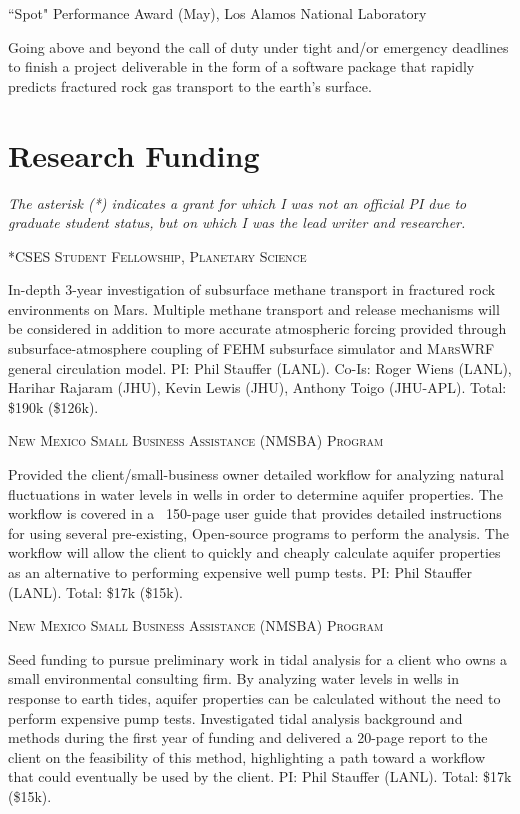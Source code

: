 \documentclass[11pt, letterpaper]{article}
\newcommand{\years}[1]{\marginnote{\scriptsize #1}}
\begin{document}
\years{2018}“Spot" Performance Award (May), Los Alamos National Laboratory
\begin{adjustwidth}{5pt}{0pt}
	Going above and beyond the call of duty under tight and/or emergency
	deadlines to finish a project deliverable in the form of a software package
	that rapidly predicts fractured rock gas transport to the earth’s surface.
\end{adjustwidth}

\section*{Research Funding}
\noindent
\emph{The asterisk (*) indicates a grant for which I was not an official PI due
to graduate student status, but on which I was the lead writer and researcher.}

\years{2021}\textsc{*CSES Student Fellowship, Planetary Science}
\begin{adjustwidth}{5pt}{0pt}
	In-depth 3-year investigation of subsurface methane transport in fractured rock
	environments on Mars. Multiple methane transport and release mechanisms 
	will be considered in addition to more accurate atmospheric forcing
	provided through subsurface-atmosphere coupling of \textsc{FEHM} subsurface
	simulator and \textsc{MarsWRF} general circulation model. 
	PI: Phil Stauffer (LANL). Co-Is: Roger Wiens (LANL), Harihar Rajaram (JHU),
	Kevin Lewis (JHU), Anthony Toigo (JHU-APL). Total: \$190k (\$126k). 
\end{adjustwidth}

\years{2021}\textsc{New Mexico Small Business Assistance (NMSBA) Program}
\begin{adjustwidth}{5pt}{0pt}
	Provided the client/small-business owner detailed workflow for analyzing
	natural fluctuations in water levels in wells in order to determine aquifer
	properties. The workflow is covered in a ~150-page user guide that provides
	detailed instructions for using several pre-existing, Open-source programs
	to perform the analysis. The workflow will allow the client to quickly and
	cheaply calculate aquifer properties as an alternative to performing
	expensive well pump tests.
	PI: Phil Stauffer (LANL). Total: \$17k (\$15k). 
\end{adjustwidth}

\years{2020}\textsc{New Mexico Small Business Assistance (NMSBA) Program}
\begin{adjustwidth}{5pt}{0pt}
	Seed funding to pursue preliminary work in tidal analysis for a client who
	owns a small environmental consulting firm. By analyzing water levels in
	wells in response to earth tides, aquifer properties can be calculated
	without the need to perform expensive pump tests.  Investigated tidal
	analysis background and methods during the first year of funding and
	delivered a 20-page report to the client on the feasibility of this method,
	highlighting a path toward a workflow that could eventually be used by the
	client.   
	PI: Phil Stauffer (LANL). Total: \$17k (\$15k). 
\end{adjustwidth}
\end{document}
